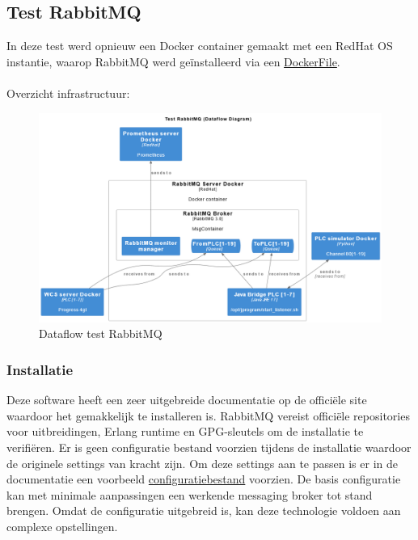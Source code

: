 \newpage
\subsection{Test RabbitMQ}
In deze test werd opnieuw een Docker container gemaakt met een RedHat OS instantie, waarop RabbitMQ 
werd geïnstalleerd via een \hyperref[listing:docker_rabbitmq]{DockerFile}.
\\\\
Overzicht infrastructuur:
\begin{figure}[!h]
  \centering
  \includegraphics[width=.95\textwidth]{img/test-rabbitmq-dataflow.png}
  \caption{\label{fig:test_rabbitmq_dataflow}Dataflow test RabbitMQ}
\end{figure}

\subsubsection{Installatie}
Deze software heeft een zeer uitgebreide documentatie op de officiële site waardoor het gemakkelijk te installeren is.
RabbitMQ vereist officiële repositories voor uitbreidingen, Erlang runtime en GPG-sleutels om de installatie te verifiëren.
Er is geen configuratie bestand voorzien tijdens de installatie waardoor de originele settings van kracht zijn.
Om deze settings aan te passen is er in de documentatie een voorbeeld \hyperref[sec:config_rabbitmq]{configuratiebestand} voorzien.
De basis configuratie kan met minimale aanpassingen een werkende messaging broker tot stand brengen.
Omdat de configuratie uitgebreid is, kan deze technologie voldoen aan complexe opstellingen.

